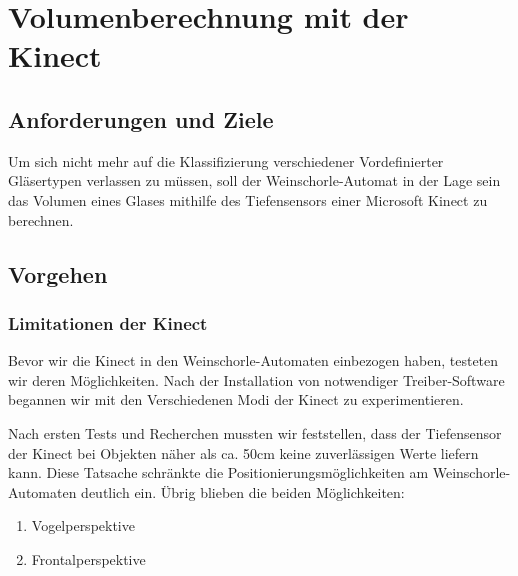\chapter{Volumenberechnung mit der Kinect}
\section{Anforderungen und Ziele}
Um sich nicht mehr auf die Klassifizierung verschiedener Vordefinierter Gläsertypen verlassen zu müssen, soll der Weinschorle-Automat in der Lage sein das Volumen eines Glases mithilfe des Tiefensensors einer Microsoft Kinect zu berechnen.

\section{Vorgehen}
\subsection{Limitationen der Kinect}
Bevor wir die Kinect in den Weinschorle-Automaten einbezogen haben, testeten wir deren Möglichkeiten. Nach der Installation von notwendiger Treiber-Software begannen wir mit den Verschiedenen Modi der Kinect zu experimentieren.

Nach ersten Tests und Recherchen mussten wir feststellen, dass der Tiefensensor der Kinect bei Objekten näher als ca. 50cm keine zuverlässigen Werte liefern kann. Diese Tatsache schränkte die Positionierungsmöglichkeiten am Weinschorle-Automaten deutlich ein. Übrig blieben die beiden Möglichkeiten: 
\begin{enumerate}
	\item Vogelperspektive
	\item Frontalperspektive
\end{enumerate}

